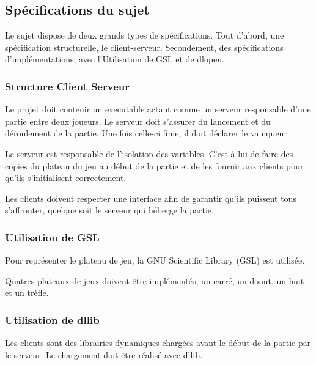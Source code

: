 \subsection{Spécifications du sujet}
Le sujet dispose de deux grands types de spécifications.
Tout d'abord, une spécification structurelle, le client-serveur.
Secondement, des spécifications d'implémentations, avec l'Utilisation 
de GSL et de dlopen.

\subsubsection{Structure Client Serveur}

Le projet doit contenir un executable actant comme un serveur responsable d'une partie entre deux joueurs.
Le serveur doit s'assurer du lancement et du déroulement de la partie. Une fois celle-ci finie, 
il doit déclarer le vainqueur.

Le serveur est responsable de l'isolation des variables. 
C'est à lui de faire des copies du plateau du jeu au début de la partie et de les fournir aux clients 
pour qu'ils s'initialisent correctement.

Les clients doivent respecter une interface afin de garantir qu'ils puissent tous s'affronter,
quelque soit le serveur qui héberge la partie.

\subsubsection{Utilisation de GSL}

Pour représenter le plateau de jeu, la GNU Scientific Library (GSL) est utilisée.

Quatres plateaux de jeux doivent être implémentés, un carré, un donut, un huit et un trèfle.

\subsubsection{Utilisation de dllib}

Les clients sont des librairies dynamiques chargées avant le début de la partie par le serveur.
Le chargement doit être réalisé avec dllib.